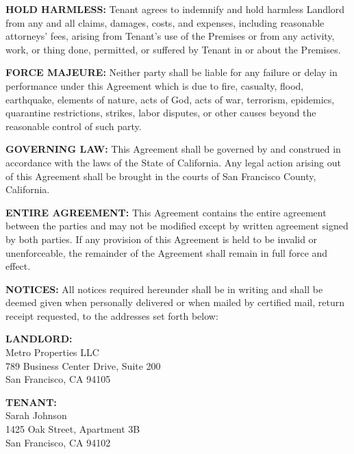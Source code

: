 \documentclass[12pt,letterpaper]{article}
\begin{document}
\vspace{0.2cm}
\noindent \textbf{HOLD HARMLESS:} Tenant agrees to indemnify and hold harmless Landlord from any and all claims, damages, costs, and expenses, including reasonable attorneys' fees, arising from Tenant's use of the Premises or from any activity, work, or thing done, permitted, or suffered by Tenant in or about the Premises.

\vspace{0.2cm}
\noindent \textbf{FORCE MAJEURE:} Neither party shall be liable for any failure or delay in performance under this Agreement which is due to fire, casualty, flood, earthquake, elements of nature, acts of God, acts of war, terrorism, epidemics, quarantine restrictions, strikes, labor disputes, or other causes beyond the reasonable control of such party.

\vspace{0.2cm}
\noindent \textbf{GOVERNING LAW:} This Agreement shall be governed by and construed in accordance with the laws of the State of California. Any legal action arising out of this Agreement shall be brought in the courts of San Francisco County, California.

\vspace{0.2cm}
\noindent \textbf{ENTIRE AGREEMENT:} This Agreement contains the entire agreement between the parties and may not be modified except by written agreement signed by both parties. If any provision of this Agreement is held to be invalid or unenforceable, the remainder of the Agreement shall remain in full force and effect.

\vspace{0.2cm}
\noindent \textbf{NOTICES:} All notices required hereunder shall be in writing and shall be deemed given when personally delivered or when mailed by certified mail, return receipt requested, to the addresses set forth below:

\vspace{0.2cm}
\noindent \textbf{LANDLORD:}\\
Metro Properties LLC\\
789 Business Center Drive, Suite 200\\
San Francisco, CA 94105

\vspace{0.2cm}
\noindent \textbf{TENANT:}\\
Sarah Johnson\\
1425 Oak Street, Apartment 3B\\
San Francisco, CA 94102
\end{document}
